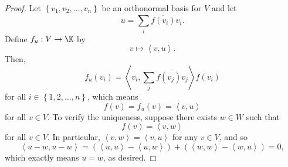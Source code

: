 \documentclass[linearalgebra]{subfiles}
\begin{document}
    \begin{proof}
        Let $\left\lbrace v_1,v_2,\ldots,v_n \right\rbrace$ be an orthonormal basis for $V$ and let 
        \begin{equation*}
            u = \sum^{}_{i} \overline{f\left( v_i \right) }v_i.
        \end{equation*}
        Define $f_u:V\to\K$ by
        \begin{equation*}
            v\mapsto\left\langle v, u\right\rangle .
        \end{equation*}
        Then,
        \begin{equation*}
            f_u\left( v_i \right) = \left\langle v_i, \sum^{}_{j} \overline{f\left( v_j \right)v_j }\right\rangle f\left( v_i \right) 
        \end{equation*}
        for all $i\in\left\lbrace 1,2,\ldots,n \right\rbrace $, which means
        \begin{equation*}
            f(v) = f_u(v) = \left\langle v, u\right\rangle 
        \end{equation*}
        for all $v\in V$. To verify the uniqueness, suppose there exists $w\in W$ such that
        \begin{equation*}
            f(v) = \left\langle v, w\right\rangle 
        \end{equation*}
        for all $v\in V$. In particular, $\left\langle v, w\right\rangle = \left\langle v, u\right\rangle$ for any $v\in V$, and so
        \begin{equation*}
            \left\langle u-w, u-w\right\rangle = \left( \left\langle u, u\right\rangle - \left\langle u, w\right\rangle  \right) + \left( \left\langle w, w\right\rangle - \left\langle w, u\right\rangle  \right) = 0,
        \end{equation*}
        which exactly means $u = w$, as desired.
    \end{proof}
\end{document}
